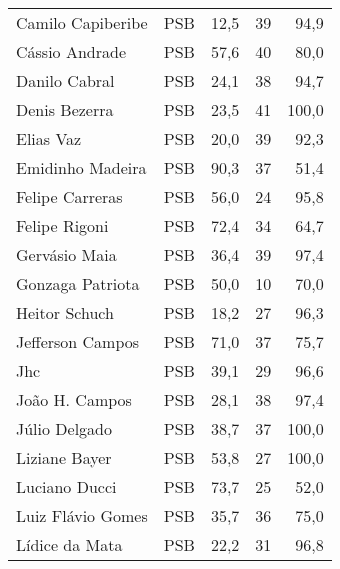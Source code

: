 \begin{longtable}{llrrr}
                   Camilo Capiberibe &            PSB &      12,5 &           39 &       94,9 \\
                      Cássio Andrade &            PSB &      57,6 &           40 &       80,0 \\
                       Danilo Cabral &            PSB &      24,1 &           38 &       94,7 \\
                       Denis Bezerra &            PSB &      23,5 &           41 &      100,0 \\
                           Elias Vaz &            PSB &      20,0 &           39 &       92,3 \\
                    Emidinho Madeira &            PSB &      90,3 &           37 &       51,4 \\
                     Felipe Carreras &            PSB &      56,0 &           24 &       95,8 \\
                       Felipe Rigoni &            PSB &      72,4 &           34 &       64,7 \\
                       Gervásio Maia &            PSB &      36,4 &           39 &       97,4 \\
                    Gonzaga Patriota &            PSB &      50,0 &           10 &       70,0 \\
                       Heitor Schuch &            PSB &      18,2 &           27 &       96,3 \\
                    Jefferson Campos &            PSB &      71,0 &           37 &       75,7 \\
                                 Jhc &            PSB &      39,1 &           29 &       96,6 \\
                      João H. Campos &            PSB &      28,1 &           38 &       97,4 \\
                       Júlio Delgado &            PSB &      38,7 &           37 &      100,0 \\
                       Liziane Bayer &            PSB &      53,8 &           27 &      100,0 \\
                       Luciano Ducci &            PSB &      73,7 &           25 &       52,0 \\
                   Luiz Flávio Gomes &            PSB &      35,7 &           36 &       75,0 \\
                      Lídice da Mata &            PSB &      22,2 &           31 &       96,8 \\

\end{longtable}
